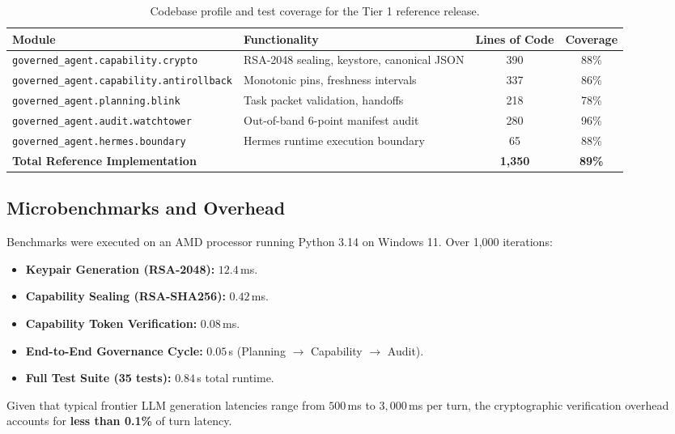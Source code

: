\documentclass[11pt,a4paper]{article}
\begin{document}
\begin{table}[h]
\centering
\small
\begin{tabular}{@{}llcc@{}}
\toprule
\textbf{Module} & \textbf{Functionality} & \textbf{Lines of Code} & \textbf{Coverage} \\
\midrule
\texttt{governed\_agent.capability.crypto} & RSA-2048 sealing, keystore, canonical JSON & 390 & 88\% \\
\texttt{governed\_agent.capability.antirollback} & Monotonic pins, freshness intervals & 337 & 86\% \\
\texttt{governed\_agent.planning.blink} & Task packet validation, handoffs & 218 & 78\% \\
\texttt{governed\_agent.audit.watchtower} & Out-of-band 6-point manifest audit & 280 & 96\% \\
\texttt{governed\_agent.hermes.boundary} & Hermes runtime execution boundary & 65 & 88\% \\
\midrule
\textbf{Total Reference Implementation} & & \textbf{1,350} & \textbf{89\%} \\
\bottomrule
\end{tabular}
\caption{Codebase profile and test coverage for the Tier 1 reference release.}
\label{tab:profile}
\end{table}

\subsection{Microbenchmarks and Overhead}
Benchmarks were executed on an AMD processor running Python 3.14 on Windows 11. Over 1,000 iterations:
\begin{itemize}
    \item \textbf{Keypair Generation (RSA-2048):} $12.4$\,ms.
    \item \textbf{Capability Sealing (RSA-SHA256):} $0.42$\,ms.
    \item \textbf{Capability Token Verification:} $0.08$\,ms.
    \item \textbf{End-to-End Governance Cycle:} $0.05$\,s (Planning $\rightarrow$ Capability $\rightarrow$ Audit).
    \item \textbf{Full Test Suite (35 tests):} $0.84$\,s total runtime.
\end{itemize}

Given that typical frontier LLM generation latencies range from $500$\,ms to $3,000$\,ms per turn, the cryptographic verification overhead accounts for \textbf{less than 0.1\%} of turn latency.
\end{document}
